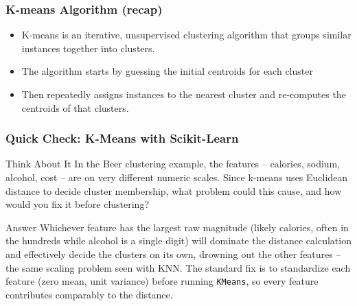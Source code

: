 \begin{frame}[fragile]\frametitle{K-means Algorithm (recap)}
\begin{itemize}
\item  K-means is an iterative, unsupervised clustering algorithm that groups similar instances together into clusters. 
\item The algorithm starts by guessing the initial centroids for each cluster
\item Then repeatedly assigns instances to the nearest cluster and re-computes the centroids of that clusters.
\end{itemize}
\end{frame}

\begin{frame}[fragile]\frametitle{Quick Check: K-Means with Scikit-Learn}
\begin{block}{Think About It}
In the Beer clustering example, the features -- calories, sodium, alcohol, cost -- are on
very different numeric scales. Since k-means uses Euclidean distance to decide cluster
membership, what problem could this cause, and how would you fix it before clustering?
\end{block}
\pause
\begin{block}{Answer}
Whichever feature has the largest raw magnitude (likely calories, often in the hundreds
while alcohol is a single digit) will dominate the distance calculation and effectively
decide the clusters on its own, drowning out the other features -- the same scaling problem
seen with KNN. The standard fix is to standardize each feature (zero mean, unit variance)
before running \texttt{KMeans}, so every feature contributes comparably to the distance.
\end{block}
\end{frame}


